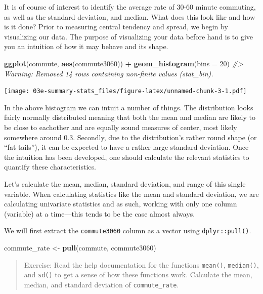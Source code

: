 \documentclass[
]{book}
\newenvironment{Shaded}{\begin{snugshade}}{\end{snugshade}}
\newcommand{\CommentTok}[1]{\textcolor[rgb]{0.56,0.35,0.01}{\textit{#1}}}
\newcommand{\DataTypeTok}[1]{\textcolor[rgb]{0.13,0.29,0.53}{#1}}
\newcommand{\DecValTok}[1]{\textcolor[rgb]{0.00,0.00,0.81}{#1}}
\newcommand{\KeywordTok}[1]{\textcolor[rgb]{0.13,0.29,0.53}{\textbf{#1}}}
\newcommand{\NormalTok}[1]{#1}
\newcommand{\OperatorTok}[1]{\textcolor[rgb]{0.81,0.36,0.00}{\textbf{#1}}}
\newcommand{\StringTok}[1]{\textcolor[rgb]{0.31,0.60,0.02}{#1}}
\begin{document}
It is of course of interest to identify the average rate of 30-60 minute commuting, as well as the standard deviation, and median. What does this look like and how is it done? Prior to measuring central tendency and spread, we begin by visualizing our data. The purpose of visualizing your data before hand is to give you an intuition of how it may behave and its shape.

\begin{Shaded}
\begin{Highlighting}[]
\KeywordTok{ggplot}\NormalTok{(commute, }\KeywordTok{aes}\NormalTok{(commute3060)) }\OperatorTok{+}
\StringTok{  }\KeywordTok{geom\_histogram}\NormalTok{(}\DataTypeTok{bins =} \DecValTok{20}\NormalTok{)}
\CommentTok{\#\textgreater{} Warning: Removed 14 rows containing non{-}finite values (stat\_bin).}
\end{Highlighting}
\end{Shaded}

\texttt{[image: 03e-summary-stats\_files/figure-latex/unnamed-chunk-3-1.pdf]}

In the above histogram we can intuit a number of things. The distribution looks fairly normally distributed meaning that both the mean and median are likely to be close to eachother and are equally sound measures of center, most likely somewhere around 0.3. Secondly, due to the distribution's rather round shape (or ``fat tails''), it can be expected to have a rather large standard deviation. Once the intuition has been developed, one should calculate the relevant statistics to quantify these characteristics.

Let's calculate the mean, median, standard deviation, and range of this single variable. When calculating statistics like the mean and standard deviation, we are calculating univariate statistics and as such, working with only one column (variable) at a time---this tends to be the case almost always.

We will first extract the \texttt{commute3060} column as a vector using \texttt{dplyr::pull()}.

\begin{Shaded}
\begin{Highlighting}[]
\NormalTok{ commute\_rate \textless{}{-}}\StringTok{ }\KeywordTok{pull}\NormalTok{(commute, commute3060)}
\end{Highlighting}
\end{Shaded}

\begin{quote}
Exercise: Read the help documentation for the functions \texttt{mean()}, \texttt{median()}, and \texttt{sd()} to get a sense of how these functions work. Calculate the mean, median, and standard deviation of \texttt{commute\_rate}.
\end{quote}
\end{document}
